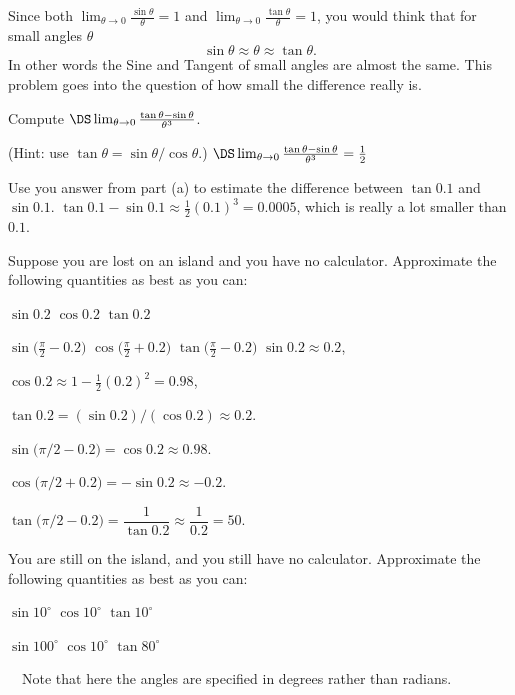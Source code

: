 \begin{multicols}{2}\setlength{\parindent}{0pt}
\problem Since both $\lim_{\theta\to0}\frac{\sin\theta}{\theta} = 1$ and
$\lim_{\theta\to0}\frac{\tan\theta}{\theta} = 1$, you would think that
for small angles $\theta$
\[
\sin\theta \approx \theta \approx \tan\theta.
\]
In other words the Sine and Tangent of small angles are almost the
same.  This problem goes into the question of how small the
difference really is.

\subprob Compute $\DS \lim_{\theta\to0}\frac{\tan\theta -
\sin\theta}{\theta^3}$.  

(Hint:  use $\tan\theta = \sin\theta/\cos\theta$.)
\answer
$\DS \lim_{\theta\to0}\frac{\tan\theta - \sin\theta}{\theta^3} =
\frac{1}{2}$
\endanswer

\subprob  Use you answer from part (a) to estimate the difference
between $\tan 0.1$ and $\sin 0.1$.
\answer
$\tan0.1 - \sin 0.1 \approx \frac{1}{2}(0.1)^{3} = 0.0005$, which is
really a lot smaller than $0.1$.
\endanswer

\problem Suppose you are lost on an island and you have no calculator.
Approximate the following quantities as best as you can:

\subprob $\sin{0.2}$
\hfill
\subprob $\cos{0.2}$
\hfill
\subprob $\tan{0.2}$

\subprob $\sin\bigl(\frac\pi2 - {0.2}\bigr)$
\hfill
\subprob $\cos\bigl(\frac\pi2 + {0.2}\bigr)$
\hfill
\subprob $\tan\bigl(\frac\pi2 - {0.2}\bigr)$
\setcounter{SUBPROB}{0}
\answer
$\sin0.2 \approx 0.2$,

$\cos{0.2} \approx 1-\frac12(0.2)^2 = 0.98$,

$\tan{0.2} = (\sin{0.2})/(\cos{0.2}) \approx 0.2$.

$\sin \bigl(\pi/2 - 0.2\bigr) = \cos 0.2 \approx 0.98$. 

$\cos \bigl(\pi/2 + 0.2\bigr) = -\sin 0.2 \approx -0.2$. 

$\tan \bigl(\pi/2 - 0.2\bigr) = \dfrac1{\tan 0.2} \approx \dfrac1{0.2} = 50$.

\endanswer
\problem You are still on the island, and you still have no
calculator.  Approximate the following quantities as best as you can:

\subprob $\sin10^\circ$
\hfill
\subprob $\cos10^\circ$
\hfill
\subprob $\tan10^\circ$


\subprob $\sin100^\circ$
\hfill
\subprob $\cos10^\circ$
\hfill
\subprob $\tan80^\circ$

\carefulnow\ \  Note that here the angles are specified in degrees rather
than radians.


\end{multicols}
